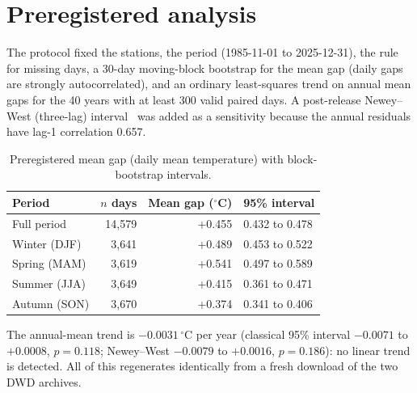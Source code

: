 \documentclass[11pt]{article}
\begin{document}
\section{Preregistered analysis}
The protocol fixed the stations, the period (1985-11-01 to 2025-12-31), the rule for missing days, a 30-day moving-block
bootstrap for the mean gap (daily gaps are strongly autocorrelated), and an ordinary least-squares trend on annual mean gaps
for the 40 years with at least 300 valid paired days. A post-release Newey--West (three-lag) interval~\cite{newey1987} was
added as a sensitivity because the annual residuals have lag-1 correlation 0.657.
\begin{table}[h]
\centering\small
\begin{tabular}{lrrl}
\toprule
Period & $n$ days & Mean gap ($^{\circ}$C) & 95\% interval\\
\midrule
Full period & 14{,}579 & +0.455 & 0.432 to 0.478\\
Winter (DJF) & 3{,}641 & +0.489 & 0.453 to 0.522\\
Spring (MAM) & 3{,}619 & +0.541 & 0.497 to 0.589\\
Summer (JJA) & 3{,}649 & +0.415 & 0.361 to 0.471\\
Autumn (SON) & 3{,}670 & +0.374 & 0.341 to 0.406\\
\bottomrule
\end{tabular}
\caption{Preregistered mean gap (daily mean temperature) with block-bootstrap intervals.}
\end{table}
The annual-mean trend is $-0.0031\,^{\circ}$C per year (classical 95\% interval $-0.0071$ to $+0.0008$, $p=0.118$; Newey--West
$-0.0079$ to $+0.0016$, $p=0.186$): no linear trend is detected. All of this regenerates identically from a fresh download
of the two DWD archives.
\end{document}
